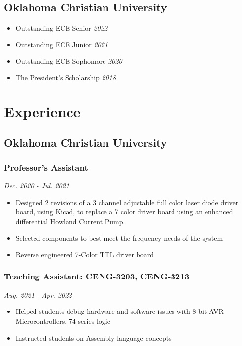 \documentclass{article}
\begin{document}
\begin{spacing}{.5}
	\subsection{Oklahoma Christian University}
		\begin{itemize}[label=$\bullet$,itemsep=-.75ex]
			\item \small{Outstanding ECE Senior} \hfill \scriptsize{\textsl{2022}}
			\item \small{Outstanding ECE Junior} \hfill \scriptsize{\textsl{2021}}
			\item \small{Outstanding ECE Sophomore} \hfill \scriptsize{\textsl{2020}}
			\item \small{The President's Scholarship} \hfill \scriptsize{\textsl{2018}}
		\end{itemize}
\section{Experience}
	\subsection{Oklahoma Christian University}
		\subsubsection{\small{Professor's Assistant}} \hfill \scriptsize{\textsl{Dec. 2020 - Jul. 2021}}
			\begin{itemize}[label=--,itemsep=-.75ex]
				\item \small{Designed 2 revisions of a 3 channel adjustable full color laser diode driver board, using Kicad, to replace a 7 color driver board using an enhanced differential Howland Current Pump.}
				\item \small{Selected components to best meet the frequency needs of the system}
				\item \small{Reverse engineered 7-Color TTL driver board}
			\end{itemize}
		\subsubsection{\small{Teaching Assistant: CENG-3203, CENG-3213}} \hfill \scriptsize{\textsl{Aug. 2021 - Apr. 2022}}
			\begin{itemize}[label=--,itemsep=-.75ex]
				\item \small{Helped students debug hardware and software issues with 8-bit AVR Microcontrollers, 74 series logic}
				\item \small{Instructed students on Assembly language concepts}
			\end{itemize}

\end{spacing}
\end{document}
